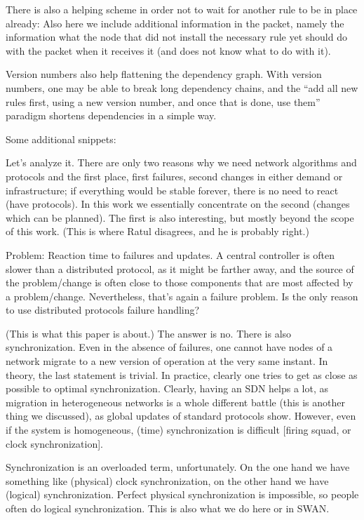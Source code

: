 There is also a helping scheme in order not to wait for another rule to be in place already: Also here we include additional information in the packet, namely the information what the node that did not install the necessary rule yet should do with the packet when it receives it (and does not know what to do with it).

Version numbers also help flattening the dependency graph. With version numbers, one may be able to break long dependency chains, and the ``add all new rules first, using a new version number, and once that is done, use them'' paradigm shortens dependencies in a simple way.




Some additional snippets:

Let’s analyze it. There are only two reasons why we need network algorithms and protocols and the first place, first failures, second changes in either demand or infrastructure; if everything would be stable forever, there is no need to react (have protocols). In this work we essentially concentrate on the second (changes which can be planned). The first is also interesting, but mostly beyond the scope of this work. (This is where Ratul disagrees, and he is probably right.)

Problem: Reaction time to failures and updates. A central controller is often slower than a distributed protocol, as it might be farther away, and the source of the problem/change is often close to those components that are most affected by a problem/change. Nevertheless, that’s again a failure problem. Is the only reason to use distributed protocols failure handling?

(This is what this paper is about.) The answer is no. There is also synchronization. Even in the absence of failures, one cannot have nodes of a network migrate to a new version of operation at the very same instant. In theory, the last statement is trivial. In practice, clearly one tries to get as close as possible to optimal synchronization. Clearly, having an SDN helps a lot, as migration in heterogeneous networks is a whole different battle (this is another thing we discussed), as global updates of standard protocols show. However, even if the system is homogeneous, (time) synchronization is difficult [firing squad, or clock synchronization].

Synchronization is an overloaded term, unfortunately. On the one hand we have something like (physical) clock synchronization, on the other hand we have (logical) synchronization. Perfect physical synchronization is impossible, so people often do logical synchronization. This is also what we do here or in SWAN.

